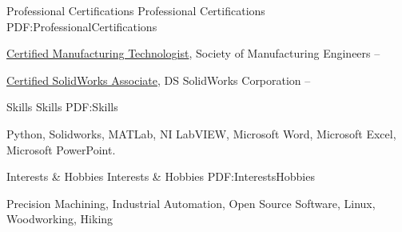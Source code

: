 \documentclass[letterpaper,MMMyyyy,nonstopmode]{simpleresumecv}
\begin{document}
\begin{Body}
\Section
{Professional Certifications}
{Professional Certifications}
{PDF:ProfessionalCertifications}

\BulletItem
\href{http://www.sme.org/cmfgt/}
{Certified Manufacturing Technologist},
Society of Manufacturing Engineers
\hfill
{} --

\BulletItem
\href{http://www.solidworks.com/sw/support/mcad-certification-programs.htm}
{Certified SolidWorks Associate},
DS SolidWorks Corporation
\hfill
{} --



\Section
{Skills}
{Skills}
{PDF:Skills}

\Entry
Python, Solidworks, MATLab, NI LabVIEW,
Microsoft Word, Microsoft Excel, Microsoft PowerPoint.



\Section
{Interests \& Hobbies}
{Interests \& Hobbies}
{PDF:InterestsHobbies}

\Entry
Precision Machining,
Industrial Automation,
Open Source Software,
Linux, Woodworking, Hiking

\end{Body}
\end{document}
